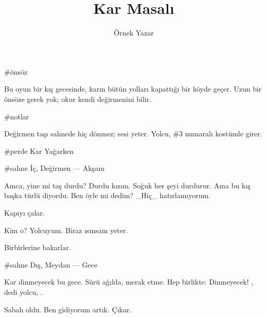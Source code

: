 \documentclass[draft]{tiyatro}
\title{Kar Masalı}
\author{Örnek Yazar}
\begin{document}
\maketitle

#önsöz

Bu oyun bir kış gecesinde, karın bütün yolları kapattığı bir köyde geçer.
Uzun bir önsöze gerek yok; okur kendi değirmenini bilir.

\kisiler

#notlar

Değirmen taşı sahnede hiç dönmez; sesi yeter. Yolcu, \#3 numaralı
kostümle girer.

#perde Kar Yağarken

#sahne İç, Değirmen — Akşam



\se Amca, yine mi taş durdu?
\oz Durdu kızım.  Soğuk her şeyi durdurur.
\se Ama \oz bu kış başka türlü diyordu.
\oz Ben öyle mi dedim? _Hiç_ hatırlamıyorum.

\ihdo Kapıyı çalar.

\se Kim o?
\ih Yolcuyum. Biraz ısınsam yeter.

\sedo\ozdo Birbirlerine bakarlar.


#sahne Dış, Meydan — Gece

\ka Kar dinmeyecek bu gece.
\co Sürü ağılda, merak etme.
\hep Hep birlikte: Dinmeyecek!
\se {}, dedi yolcu, .
\beat

\perde[]

\sahne[][2.1]

\oz Sabah oldu.
\ih Ben gidiyorum artık.
\ihdo Çıkar.
\end{document}
